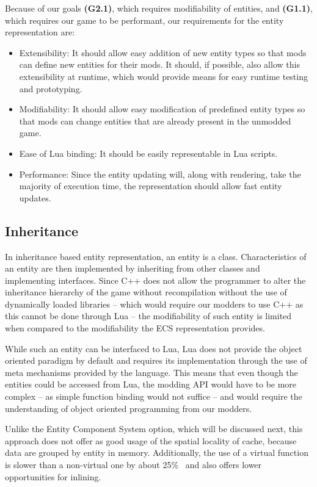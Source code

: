 Because of our goals \textbf{(G2.1)}, which requires modifiability of entities, and \textbf{(G1.1)}, which requires our game to be
performant, our requirements for the entity representation are:

\begin{itemize}
    \item Extensibility: It should allow easy addition of new entity types so that mods can define new entities for their mods. It
        should, if possible, also allow this extensibility at runtime, which would provide means for easy runtime testing and prototyping.
    \item Modifiability: It should allow easy modification of predefined entity types so that mods can change entities that are already
        present in the unmodded game.
    \item Ease of Lua binding: It should be easily representable in Lua scripts.
    \item Performance: Since the entity updating will, along with rendering, take the majority of execution time, the representation should
        allow fast entity updates.
\end{itemize}

\subsection{Inheritance}

In inheritance based entity representation, an entity is a class. Characteristics of an entity are then implemented by inheriting
from other classes and implementing interfaces. Since C++ does not allow the programmer to alter the inheritance hierarchy of the game
without recompilation without the use of dynamically loaded libraries -- which would require our modders to use C++ as this cannot
be done through Lua -- the modifiability of such entity is limited when compared to the modifiability the ECS representation provides.

While such an entity can be interfaced to Lua, Lua does not provide the object oriented paradigm by default and requires its implementation
through the use of meta mechanisms provided by the language. This means that even though the entities could be accessed from Lua, the
modding API would have to be more complex -- as simple function binding would not suffice -- and would require the understanding
of object oriented programming from our modders.

Unlike the Entity Component System option, which will be discussed next, this approach does not offer as good usage of the spatial
locality of cache, because data are grouped by entity in memory.
Additionally, the use of a virtual function is slower than a non-virtual one by about 25\%~\cite{CppProgLang} and also offers lower 
opportunities for inlining.

